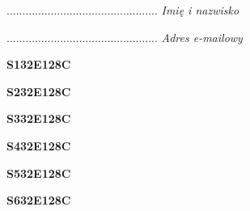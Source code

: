 \begin{turn}{90}\begin{minipage}{\linewidth} \vspace{20mm} ................................................  \textit{Imię i nazwisko}\end{minipage}\end{turn}

\begin{turn}{90}\begin{minipage}{\linewidth} \vspace{20mm} ................................................  \textit{Adres e-mailowy}\end{minipage}\end{turn}

\begin{turn}{90}\huge \begin{minipage}{\linewidth} \vspace{10mm}\textbf{S132E128C}\end{minipage}\end{turn}

\begin{turn}{90}\huge \begin{minipage}{\linewidth} \vspace{10mm}\textbf{S232E128C}\end{minipage}\end{turn}

\begin{turn}{90}\huge \begin{minipage}{\linewidth} \vspace{10mm}\textbf{S332E128C}\end{minipage}\end{turn}

\begin{turn}{90}\huge \begin{minipage}{\linewidth} \vspace{10mm}\textbf{S432E128C}\end{minipage}\end{turn}

\begin{turn}{90}\huge \begin{minipage}{\linewidth} \vspace{10mm}\textbf{S532E128C}\end{minipage}\end{turn}

\begin{turn}{90}\huge \begin{minipage}{\linewidth} \vspace{10mm}\textbf{S632E128C}\end{minipage}\end{turn}

